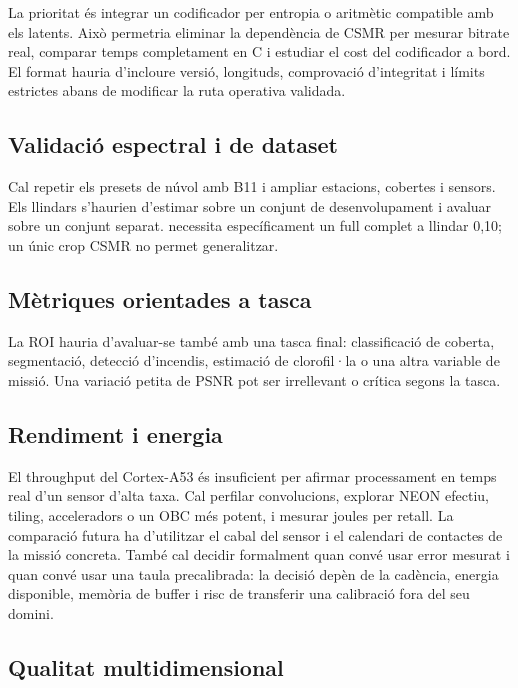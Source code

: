 La prioritat és integrar un codificador per entropia o aritmètic compatible amb
els latents. Això permetria eliminar la dependència de CSMR per mesurar bitrate
real, comparar temps completament en C i estudiar el cost del codificador a
bord. El format hauria d'incloure versió, longituds, comprovació d'integritat i
límits estrictes abans de modificar la ruta operativa validada.

\subsection{Validació espectral i de dataset}

Cal repetir els presets de núvol amb B11 i ampliar estacions, cobertes i
sensors. Els llindars s'haurien d'estimar sobre un conjunt de desenvolupament
i avaluar sobre un conjunt separat.  necessita específicament
un full complet a llindar 0,10; un únic crop CSMR no permet generalitzar.

\subsection{Mètriques orientades a tasca}

La ROI hauria d'avaluar-se també amb una tasca final: classificació de coberta,
segmentació, detecció d'incendis, estimació de clorofil·la o una altra variable
de missió. Una variació petita de PSNR pot ser irrellevant o crítica segons la
tasca.

\subsection{Rendiment i energia}

El throughput del Cortex-A53 és insuficient per afirmar processament en temps
real d'un sensor d'alta taxa. Cal perfilar convolucions, explorar NEON efectiu,
tiling, acceleradors o un OBC més potent, i mesurar joules per retall. La
comparació futura ha d'utilitzar el cabal del sensor i el calendari de
contactes de la missió concreta. També cal decidir formalment quan convé usar
error mesurat i quan convé usar una taula precalibrada: la decisió depèn de la
cadència, energia disponible, memòria de buffer i risc de transferir una
calibració fora del seu domini.

\subsection{Qualitat multidimensional}

